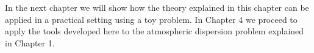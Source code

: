 \documentclass[12pt]{book}
\begin{document}
In the next chapter we will show how  the theory explained in  this chapter
can be applied in a practical setting using a toy problem. In Chapter 4 we 
proceed to apply the tools developed here to the atmospheric dispersion problem explained in Chapter 1.


%
%
%
%
%
% 
%
\end{document}
